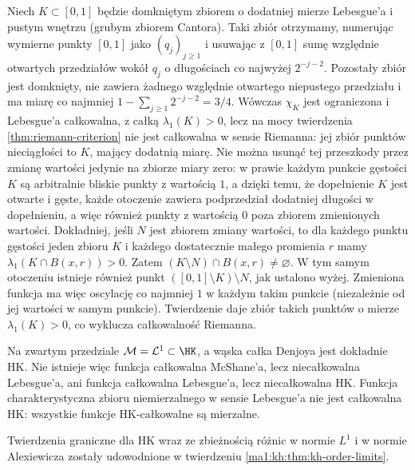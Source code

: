 \begin{przyklad}
Niech $K\subset[0,1]$ będzie domkniętym zbiorem o dodatniej mierze Lebesgue'a i pustym wnętrzu (grubym zbiorem Cantora). Taki zbiór otrzymamy, numerując wymierne punkty $[0,1]$ jako $(q_j)_{j\ge1}$ i usuwając z $[0,1]$ sumę względnie otwartych przedziałów wokół $q_j$ o długościach co najwyżej $2^{-j-2}$. Pozostały zbiór jest domknięty, nie zawiera żadnego względnie otwartego niepustego przedziału i ma miarę co najmniej $1-\sum_{j\ge1}2^{-j-2}=3/4$. Wówczas $\chi_K$ jest ograniczona i Lebesgue'a całkowalna, z całką $\lambda_1(K)>0$, lecz na mocy twierdzenia \ref{thm:riemann-criterion} nie jest całkowalna w sensie Riemanna: jej zbiór punktów nieciągłości to $K$, mający dodatnią miarę. Nie można usunąć tej przeszkody przez zmianę wartości jedynie na zbiorze miary zero: w prawie każdym punkcie gęstości $K$ są arbitralnie bliskie punkty z wartością $1$, a dzięki temu, że dopełnienie $K$ jest otwarte i gęste, każde otoczenie zawiera podprzedział dodatniej długości w dopełnieniu, a więc również punkty z wartością $0$ poza zbiorem zmienionych wartości. Dokładniej, jeśli $N$ jest zbiorem zmiany wartości, to dla każdego punktu gęstości jeden zbioru $K$ i każdego dostatecznie małego promienia $r$ mamy $\lambda_1(K\cap B(x,r))>0$. Zatem $(K\setminus N)\cap B(x,r)\ne\varnothing$. W tym samym otoczeniu istnieje również punkt $( [0,1]\setminus K)\setminus N$, jak ustalono wyżej. Zmieniona funkcja ma więc oscylację co najmniej $1$ w każdym takim punkcie (niezależnie od jej wartości w samym punkcie). Twierdzenie  daje zbiór takich punktów o mierze $\lambda_1(K)>0$, co wyklucza całkowalność Riemanna.
\end{przyklad}
\begin{uwaga}
Na zwartym przedziale $\mathcal M=\mathcal L^1\subset\HK$, a wąska całka Denjoya jest dokładnie HK. Nie istnieje więc funkcja całkowalna McShane'a, lecz niecałkowalna Lebesgue'a, ani funkcja całkowalna Lebesgue'a, lecz niecałkowalna HK. Funkcja charakterystyczna zbioru niemierzalnego w sensie Lebesgue'a nie jest całkowalna HK: wszystkie funkcje HK-całkowalne są mierzalne.
\end{uwaga}

Twierdzenia graniczne dla HK wraz ze zbieżnością różnic
w normie $L^1$ i w normie Alexiewicza zostały udowodnione
w twierdzeniu \ref{ma1:kh:thm:kh-order-limits}.



